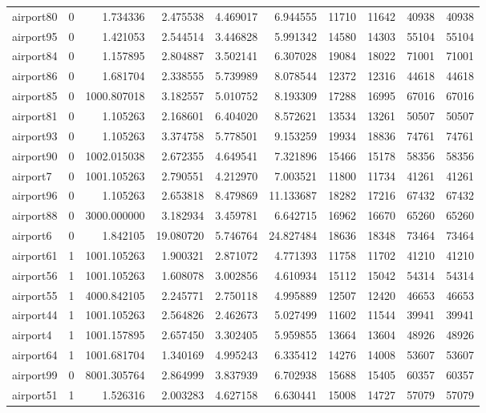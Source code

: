 \begin{longtable}{|l|r|r|r|r|r|r|r|r|r|}
airport80 & 0 & 1.734336 & 2.475538 & 4.469017 & 6.944555 & 11710 & 11642 & 40938 & 40938 \\
airport95 & 0 & 1.421053 & 2.544514 & 3.446828 & 5.991342 & 14580 & 14303 & 55104 & 55104 \\
airport84 & 0 & 1.157895 & 2.804887 & 3.502141 & 6.307028 & 19084 & 18022 & 71001 & 71001 \\
airport86 & 0 & 1.681704 & 2.338555 & 5.739989 & 8.078544 & 12372 & 12316 & 44618 & 44618 \\
airport85 & 0 & 1000.807018 & 3.182557 & 5.010752 & 8.193309 & 17288 & 16995 & 67016 & 67016 \\
airport81 & 0 & 1.105263 & 2.168601 & 6.404020 & 8.572621 & 13534 & 13261 & 50507 & 50507 \\
airport93 & 0 & 1.105263 & 3.374758 & 5.778501 & 9.153259 & 19934 & 18836 & 74761 & 74761 \\
airport90 & 0 & 1002.015038 & 2.672355 & 4.649541 & 7.321896 & 15466 & 15178 & 58356 & 58356 \\
airport7 & 0 & 1001.105263 & 2.790551 & 4.212970 & 7.003521 & 11800 & 11734 & 41261 & 41261 \\
airport96 & 0 & 1.105263 & 2.653818 & 8.479869 & 11.133687 & 18282 & 17216 & 67432 & 67432 \\
airport88 & 0 & 3000.000000 & 3.182934 & 3.459781 & 6.642715 & 16962 & 16670 & 65260 & 65260 \\
airport6 & 0 & 1.842105 & 19.080720 & 5.746764 & 24.827484 & 18636 & 18348 & 73464 & 73464 \\
airport61 & 1 & 1001.105263 & 1.900321 & 2.871072 & 4.771393 & 11758 & 11702 & 41210 & 41210 \\
airport56 & 1 & 1001.105263 & 1.608078 & 3.002856 & 4.610934 & 15112 & 15042 & 54314 & 54314 \\
airport55 & 1 & 4000.842105 & 2.245771 & 2.750118 & 4.995889 & 12507 & 12420 & 46653 & 46653 \\
airport44 & 1 & 1001.105263 & 2.564826 & 2.462673 & 5.027499 & 11602 & 11544 & 39941 & 39941 \\
airport4 & 1 & 1001.157895 & 2.657450 & 3.302405 & 5.959855 & 13664 & 13604 & 48926 & 48926 \\
airport64 & 1 & 1001.681704 & 1.340169 & 4.995243 & 6.335412 & 14276 & 14008 & 53607 & 53607 \\
airport99 & 0 & 8001.305764 & 2.864999 & 3.837939 & 6.702938 & 15688 & 15405 & 60357 & 60357 \\
airport51 & 1 & 1.526316 & 2.003283 & 4.627158 & 6.630441 & 15008 & 14727 & 57079 & 57079 \\

\end{longtable}
